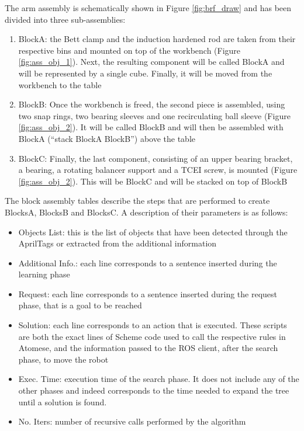 The arm assembly is schematically shown in Figure \ref{fig:brf_draw} and has been divided into three sub-assemblies:

\begin{enumerate}
	\item BlockA: the Bett clamp and the induction hardened rod are taken from their respective bins and mounted on top of the workbench (Figure \ref{fig:ass_obj_1}). Next, the resulting component will be called BlockA and will be represented by a single cube. Finally, it will be moved from the workbench to the table

	\item BlockB: Once the workbench is freed, the second piece is assembled, using two snap rings, two bearing sleeves and one recirculating ball sleeve (Figure \ref{fig:ass_obj_2}). It will be called BlockB and will then be assembled with BlockA (\enquote{stack BlockA BlockB}) above the table

	\item BlockC: Finally, the last component, consisting of an upper bearing bracket, a bearing, a rotating balancer support and a TCEI screw, is mounted (Figure \ref{fig:ass_obj_2}). This will be BlockC and will be stacked on top of BlockB
\end{enumerate}

The block assembly tables describe the steps that are performed to create BlocksA, BlocksB and BlocksC. A description of their parameters is as follows:

\begin{itemize}
	\item Objects List: this is the list of objects that have been detected through the AprilTags or extracted from the additional information
	\item Additional Info.: each line corresponds to a sentence inserted during the learning phase
	\item Request: each line corresponds to a sentence inserted during the request phase, that is a goal to be reached
	\item Solution: each line corresponds to an action that is executed. These scripts are both the exact lines of Scheme code used to call the respective rules in Atomese, and the information passed to the ROS client, after the search phase, to move the robot
	\item Exec. Time: execution time of the search phase. It does not include any of the other phases and indeed corresponds to the time needed to expand the tree until a solution is found.
	\item No. Iters: number of recursive calls performed by the algorithm
\end{itemize} 

